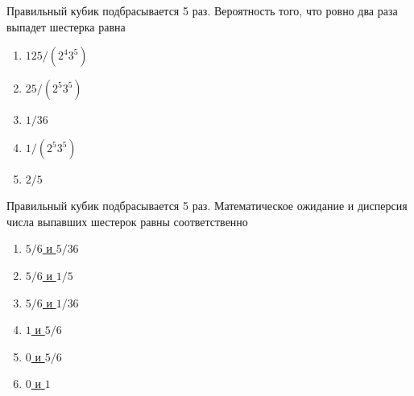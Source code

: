 \documentclass[t]{beamer}
\begin{document}
 \begin{frame} \label{22} 
\begin{block}{22} 

  Правильный кубик подбрасывается 5 раз. Вероятность того, что ровно два раза выпадет шестерка равна
  


 \end{block} 
\begin{enumerate} 
\item[] \hyperlink{22-No}{\beamergotobutton{} $125/(2^4 3^5)$}
\item[] \hyperlink{22-No}{\beamergotobutton{} $25/(2^5 3^5)$}
\item[] \hyperlink{22-No}{\beamergotobutton{} $1/36$}
\item[] \hyperlink{22-No}{\beamergotobutton{} $1/(2^5 3^5)$}
\item[] \hyperlink{22-No}{\beamergotobutton{} $2/5$}
\end{enumerate} 
\end{frame} 


 \begin{frame} \label{23} 
\begin{block}{23} 

Правильный кубик подбрасывается 5 раз. Математическое ожидание и дисперсия числа выпавших шестерок равны соответственно
  


 \end{block} 
\begin{enumerate} 
\item[] \hyperlink{23-No}{\beamergotobutton{} $5/6$ и $5/36$}
\item[] \hyperlink{23-No}{\beamergotobutton{} $5/6$ и $1/5$}
\item[] \hyperlink{23-No}{\beamergotobutton{} $5/6$ и $1/36$}
\item[] \hyperlink{23-No}{\beamergotobutton{} $1$ и $5/6$}
\item[] \hyperlink{23-No}{\beamergotobutton{} $0$ и $5/6$}
\item[] \hyperlink{23-No}{\beamergotobutton{} $0$ и $1$}
\end{enumerate} 
\end{frame} 
\end{document}
